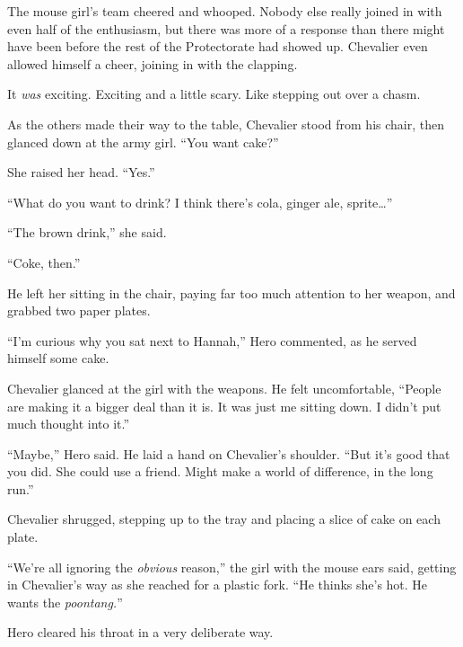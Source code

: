 The mouse girl's team cheered and whooped.  Nobody else really joined in with even half of the enthusiasm, but there was more of a response than there might have been before the rest of the Protectorate had showed up.  Chevalier even allowed himself a cheer, joining in with the clapping.



It \emph{was} exciting.  Exciting and a little scary.  Like stepping out over a chasm.



As the others made their way to the table, Chevalier stood from his chair, then glanced down at the army girl.  ``You want cake?''



She raised her head.  ``Yes.''



``What do you want to drink?  I think there's cola, ginger ale, sprite\ldots''



``The brown drink,'' she said.



``Coke, then.''



He left her sitting in the chair, paying far too much attention to her weapon, and grabbed two paper plates.



``I'm curious why you sat next to Hannah,'' Hero commented, as he served himself some cake.



Chevalier glanced at the girl with the weapons.  He felt uncomfortable, ``People are making it a bigger deal than it is.  It was just me sitting down.  I didn't put much thought into it.''



``Maybe,'' Hero said.  He laid a hand on Chevalier's shoulder.  ``But it's good that you did.  She could use a friend.  Might make a world of difference, in the long run.''



Chevalier shrugged, stepping up to the tray and placing a slice of cake on each plate.



``We're all ignoring the \emph{obvious} reason,'' the girl with the mouse ears said, getting in Chevalier's way as she reached for a plastic fork.  ``He thinks she's hot.  He wants the \emph{poontang.}''



Hero cleared his throat in a very deliberate way.



